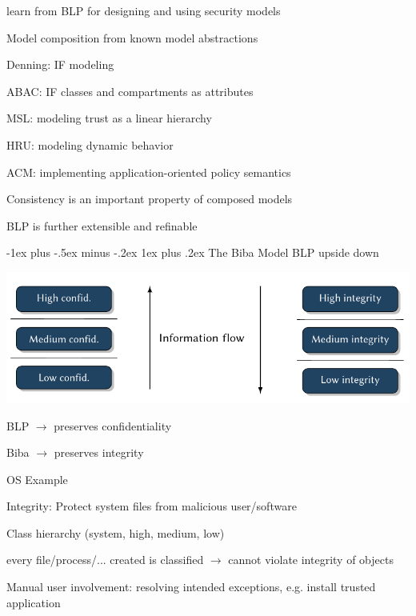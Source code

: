 \documentclass[a4paper]{article}
\makeatletter
\renewcommand{\subsubsection}{\@startsection{subsubsection}{3}{0mm}%
                {-1ex plus -.5ex minus -.2ex}%
                {1ex plus .2ex}%
                {\normalfont\small\bfseries}}
\makeatother
\begin{document}
\begin{multicols}{3}
    learn from BLP for designing and using security models
    \begin{itemize*}
        \item Model composition from known model abstractions
        \begin{itemize*}
            \item Denning: IF modeling
            \item ABAC: IF classes and compartments as attributes
            \item MSL: modeling trust as a linear hierarchy
            \item HRU: modeling dynamic behavior
            \item ACM: implementing application-oriented policy semantics
        \end{itemize*}
        \item Consistency is an important property of composed models
        \item BLP is further extensible and refinable
    \end{itemize*}

    \subsubsection{The Biba Model}
    BLP upside down

    \begin{center}
        \includegraphics[width=.5\linewidth]{Assets/Systemsicherheit-blp-vs-biba.png}
    \end{center}
    \begin{itemize*}
        \item BLP $\rightarrow$ preserves confidentiality
        \item Biba $\rightarrow$ preserves integrity
    \end{itemize*}

    OS Example
    \begin{itemize*}
        \item Integrity: Protect system files from malicious user/software
        \item Class hierarchy (system, high, medium, low)
        \item every file/process/... created is classified $\rightarrow$ cannot violate integrity of objects
        \item Manual user involvement: resolving intended exceptions, e.g. install trusted application
    \end{itemize*}



\end{multicols}
\end{document}
